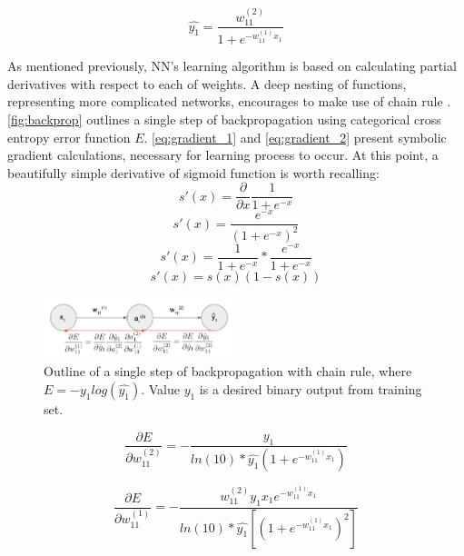 \documentclass[11pt]{article}
\begin{document}
\begin{equation} \label{eq:inference}
\hat{y_1} = \frac{w_{11}^{(2)}}{1 + e^{-w_{11}^{(1)}x_1}}
\end{equation}

As mentioned previously, NN's learning algorithm is based on calculating partial derivatives with respect to each of weights. A deep nesting of functions, representing more complicated networks, encourages to make use of chain rule \cite{chain_rule_def}. \autoref{fig:backprop} outlines a single step of backpropagation using categorical cross entropy error function $E$. \autoref{eq:gradient_1} and \autoref{eq:gradient_2} present symbolic gradient calculations, necessary for learning process to occur. At this point, a beautifully simple derivative of sigmoid function is worth recalling:
\[ s'(x) = \frac{\partial}{\partial x}\frac{1}{1 + e^{-x}}\]
\[s'(x) = \frac{e^{-x}}{(1 + e^{-x})^2} \]
\[s'(x) = \frac{1}{1 + e^{-x}} * \frac{e^{-x}}{1 + e^{-x}}\]
\[ s'(x) = s(x)(1 - s(x))\]

\begin{figure}[h]
\includegraphics[width=0.5\textwidth]{backprop}
\centering
\caption{Outline of a single step of backpropagation with chain rule, where $E=-y_1log(\hat{y_1})$. Value $y_1$ is a desired binary output from training set.}
\label{fig:backprop}
\end{figure}

\begin{equation} \label{eq:gradient_1}
\frac{\partial E}{\partial w_{11}^{(2)}} = - \frac{y_1}{ln(10) * \hat{y_1}(1 + e^{-w_{11}^{(1)}x_1})}
\end{equation}

\begin{equation} \label{eq:gradient_2}
\frac{\partial E}{\partial w_{11}^{(1)}} = - \frac{w_{11}^{(2)}y_1x_1e^{-w_{11}^{(1)}x_1}}{ln(10) * \hat{y_1}[(1 + e^{-w_{11}^{(1)}x_1})^2]}
\end{equation}
\end{document}
